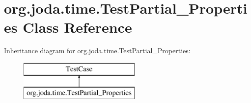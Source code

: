 \hypertarget{classorg_1_1joda_1_1time_1_1_test_partial___properties}{\section{org.\-joda.\-time.\-Test\-Partial\-\_\-\-Properties Class Reference}
\label{classorg_1_1joda_1_1time_1_1_test_partial___properties}
}
Inheritance diagram for org.\-joda.\-time.\-Test\-Partial\-\_\-\-Properties\-:\begin{figure}[H]
\begin{center}
\leavevmode
\includegraphics[height=2.000000cm]{classorg_1_1joda_1_1time_1_1_test_partial___properties}
\end{center}
\end{figure}
